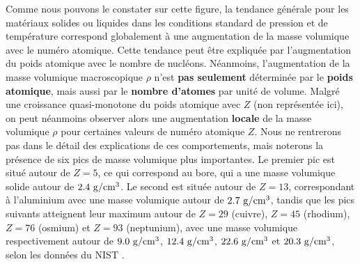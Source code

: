 \begin{refsection}
Comme nous pouvons le constater sur cette figure, la tendance générale pour les matériaux solides ou liquides dans les conditions standard de pression et de température correspond globalement à une augmentation de la masse volumique avec le numéro atomique. Cette tendance peut être expliquée par l'augmentation du poids atomique avec le nombre de nucléons. Néanmoins, l’augmentation de la masse volumique macroscopique $\rho$ n'est \textbf{pas seulement} déterminée par le \textbf{poids atomique}, mais aussi par le \textbf{nombre d'atomes} par unité de volume. Malgré une croissance quasi-monotone du poids atomique avec $Z$ (non représentée ici), on peut néanmoins observer alors une augmentation \textbf{locale} de la masse volumique $\rho$ pour certaines valeurs de numéro atomique $Z$. Nous ne rentrerons pas dans le détail des explications de ces comportements, mais noterons la présence de six pics de masse volumique plus importantes. Le premier pic est situé autour de $Z=5$, ce qui correspond au bore, qui a une masse volumique solide autour de $2.4 ~ \rm g/cm^3$. Le second est située autour de $Z=13$, correspondant à l'aluminium avec une masse volumique autour de $2.7 ~ \rm g/cm^3$, tandis que les pics suivants atteignent leur maximum autour de $Z=29$ (cuivre), $Z=45$ (rhodium), $Z=76$ (osmium) et $Z=93$ (neptunium), avec une masse volumique respectivement autour de $9.0 ~ \rm g/cm^3$, $12.4 ~ \rm g/cm^3$, $22.6 ~ \rm g/cm^3$ et $20.3~ \rm g/cm^3$, selon les données du NIST \parencite{berger_1999a}. 


\end{refsection}
